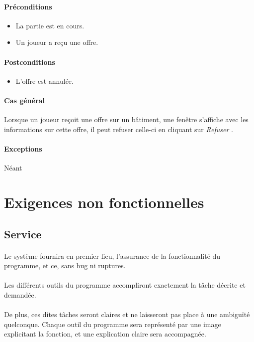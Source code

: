 \documentclass[a4paper,11pt]{report}
\begin{document}
\paragraph{Préconditions}
\begin{itemize}
 \item La partie est en cours.
 \item Un joueur a reçu une offre.
\end{itemize}
\paragraph{Postconditions}
\begin{itemize}
 \item L'offre est annulée.
\end{itemize}
\paragraph{Cas général}
Lorsque un joueur reçoit une offre sur un bâtiment, une fenêtre s'affiche avec les informations sur cette offre, il peut refuser celle-ci en cliquant sur \og \textit{Refuser} \fg.
\paragraph{Exceptions} Néant

\newpage
\section{Exigences non fonctionnelles}
\subsection{Service}
\paragraph{}
Le système fournira en premier lieu, l’assurance de la fonctionnalité du programme, et ce, sans bug ni ruptures.
\paragraph{}
Les différents outils du programme accompliront exactement la tâche décrite et demandée.
\paragraph{}
De plus, ces dites tâches seront claires et ne laisseront pas place à une ambiguïté quelconque.
Chaque outil du programme sera représenté par une image explicitant la fonction, et une explication claire sera accompagnée.
\end{document}
